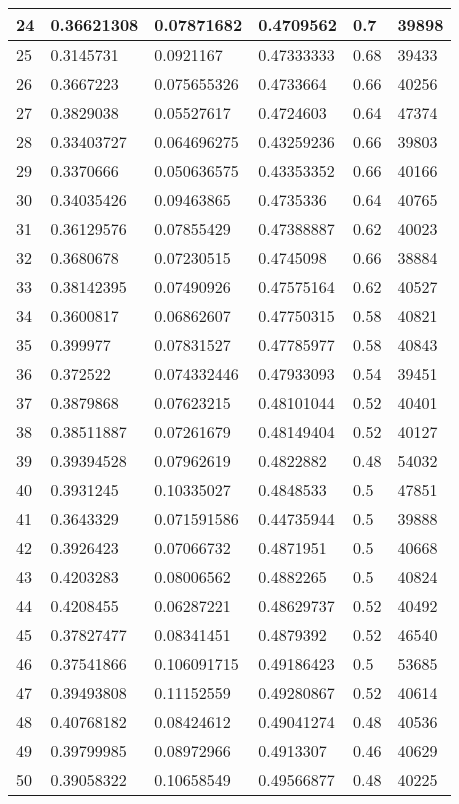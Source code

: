 \begin{longtable}{|l|l|l|l|l|l|}
24 & 0.36621308 & 0.07871682 & 0.4709562 & 0.7 & 39898 \\ \hline 
25 & 0.3145731 & 0.0921167 & 0.47333333 & 0.68 & 39433 \\ \hline 
26 & 0.3667223 & 0.075655326 & 0.4733664 & 0.66 & 40256 \\ \hline 
27 & 0.3829038 & 0.05527617 & 0.4724603 & 0.64 & 47374 \\ \hline 
28 & 0.33403727 & 0.064696275 & 0.43259236 & 0.66 & 39803 \\ \hline 
29 & 0.3370666 & 0.050636575 & 0.43353352 & 0.66 & 40166 \\ \hline 
30 & 0.34035426 & 0.09463865 & 0.4735336 & 0.64 & 40765 \\ \hline 
31 & 0.36129576 & 0.07855429 & 0.47388887 & 0.62 & 40023 \\ \hline 
32 & 0.3680678 & 0.07230515 & 0.4745098 & 0.66 & 38884 \\ \hline 
33 & 0.38142395 & 0.07490926 & 0.47575164 & 0.62 & 40527 \\ \hline 
34 & 0.3600817 & 0.06862607 & 0.47750315 & 0.58 & 40821 \\ \hline 
35 & 0.399977 & 0.07831527 & 0.47785977 & 0.58 & 40843 \\ \hline 
36 & 0.372522 & 0.074332446 & 0.47933093 & 0.54 & 39451 \\ \hline 
37 & 0.3879868 & 0.07623215 & 0.48101044 & 0.52 & 40401 \\ \hline 
38 & 0.38511887 & 0.07261679 & 0.48149404 & 0.52 & 40127 \\ \hline 
39 & 0.39394528 & 0.07962619 & 0.4822882 & 0.48 & 54032 \\ \hline 
40 & 0.3931245 & 0.10335027 & 0.4848533 & 0.5 & 47851 \\ \hline 
41 & 0.3643329 & 0.071591586 & 0.44735944 & 0.5 & 39888 \\ \hline 
42 & 0.3926423 & 0.07066732 & 0.4871951 & 0.5 & 40668 \\ \hline 
43 & 0.4203283 & 0.08006562 & 0.4882265 & 0.5 & 40824 \\ \hline 
44 & 0.4208455 & 0.06287221 & 0.48629737 & 0.52 & 40492 \\ \hline 
45 & 0.37827477 & 0.08341451 & 0.4879392 & 0.52 & 46540 \\ \hline 
46 & 0.37541866 & 0.106091715 & 0.49186423 & 0.5 & 53685 \\ \hline 
47 & 0.39493808 & 0.11152559 & 0.49280867 & 0.52 & 40614 \\ \hline 
48 & 0.40768182 & 0.08424612 & 0.49041274 & 0.48 & 40536 \\ \hline 
49 & 0.39799985 & 0.08972966 & 0.4913307 & 0.46 & 40629 \\ \hline 
50 & 0.39058322 & 0.10658549 & 0.49566877 & 0.48 & 40225 \\ \hline 
\end{longtable}